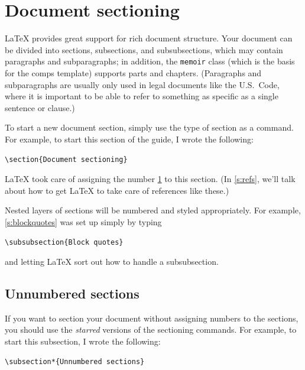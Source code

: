 \documentclass{article}
\newcommand*{\code}[1]{\texttt{#1}}
\begin{document}
\section{Document sectioning}
\label{s:sectioning}
\LaTeX{} provides great support for rich document structure.
Your document can be divided into sections, subsections, and subsubsections, which may contain paragraphs and subparagraphs; in addition, the \code{memoir} class (which is the basis for the comps template) supports parts and chapters.
(Paragraphs and subparagraphs are usually only used in legal documents like the U.S.~Code, where it is important to be able to refer to something as specific as a single sentence or clause.)

To start a new document section, simply use the type of section as a command.
For example, to start this section of the guide, I wrote the following:
\begin{verbatim}
\section{Document sectioning}
\end{verbatim}
\LaTeX{} took care of assigning the number \ref{s:sectioning} to this section.
(In \cref{s:refs}, we'll talk about how to get \LaTeX{} to take care of references like these.)

Nested layers of sections will be numbered and styled appropriately.
For example, \cref{s:blockquotes} was set up simply by typing
\begin{verbatim}
\subsubsection{Block quotes}
\end{verbatim}
and letting \LaTeX{} sort out how to handle a subsubsection.

\subsection*{Unnumbered sections}
If you want to section your document without assigning numbers to the sections, you should use the \emph{starred} versions of the sectioning commands.
For example, to start this subsection, I wrote the following:
\begin{verbatim}
\subsection*{Unnumbered sections}
\end{verbatim}
\end{document}
